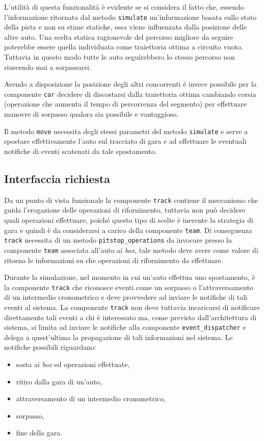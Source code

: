 \documentclass[a4paper]{report}
\newcommand{\fun}[1]{\texttt{#1}}
\begin{document}
L'utilità di questa funzionalità è evidente se si considera il fatto che, essendo l'informazione ritornata dal metodo \fun{simulate} un'informazione basata sullo stato della pista e non su stime statiche, essa viene influenzata dalla posizione delle altre auto. Una scelta statica ragionevole del percorso migliore da seguire poterebbe essere quella individuata come traiettoria ottima a circuito vuoto. Tuttavia in questo modo tutte le auto seguirebbero lo stesso percorso non riuscendo mai a sorpassarsi.

Avendo a disposizione la posizione degli altri concorrenti è invece possibile per la componente \texttt{car} decidere di discostarsi dalla traiettoria ottima cambiando corsia (operazione che aumenta il tempo di percorrenza del segmento) per effettuare manovre di sorpasso qualora sia possibile e vantaggioso.

Il metodo \fun{move} necessita degli stessi parametri del metodo \fun{simulate} e serve a spostare effettivamente l'auto sul tracciato di gara e ad effettuare le eventuali notifiche di eventi scatenati da tale spostamento.

\subsection*{Interfaccia richiesta}
Da un punto di vista funzionale la componente \texttt{track} contiene il meccanismo che guida l'erogazione delle operazioni di rifornimento, tuttavia non può decidere quali operazioni effettuare, poiché questo tipo di scelte è inerente la strategia di gara e quindi è da considerarsi a carico della componente \texttt{team}. Di conseguenza \texttt{track} necessita di un metodo \fun{pitstop\_operations} da invocare presso la componente \texttt{team} associata all'auto ai \textit{box}, tale metodo deve avere come valore di ritorno le informazioni su che operazioni di rifornimento da effettuare.

Durante la simulazione, nel momento in cui un'auto effettua uno spostamento, è la componente \texttt{track} che riconosce eventi come un sorpasso o l'attraversamento di un intermedio cronometrico e deve provvedere ad inviare le notifiche di tali eventi al sistema. La componente \texttt{track} non deve tuttavia incaricarsi di notificare direttamente tali eventi a chi è interessato ma, come previsto dall'architettura di sistema, si limita ad inviare le notifiche alla componente \texttt{event\_dispatcher} e delega a quest'ultima la propagazione di tali informazioni nel sistema.
Le notifiche possibili riguardano:
\begin{itemize}
\item sosta ai \textit{box} ed operazioni effettuate,
\item ritiro dalla gara di un'auto,
\item attraversamento di un intermedio cronometrico,
\item sorpasso,
\item fine della gara.
\end{itemize}
\end{document}
